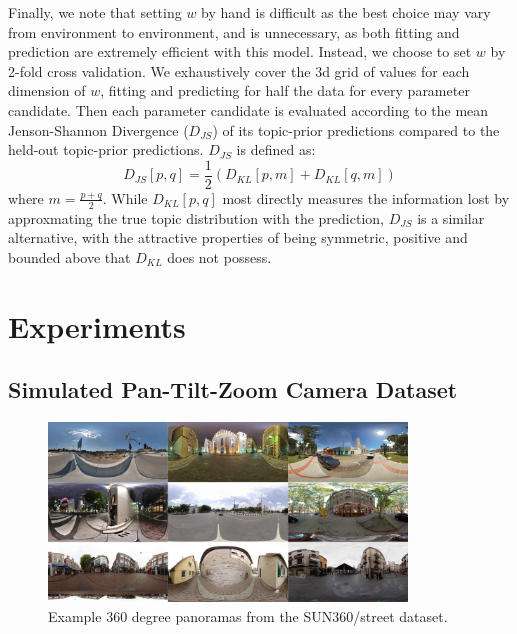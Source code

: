 Finally, we note that setting $w$ by hand is difficult as the best choice may vary from environment to environment, and is unnecessary, as both fitting and prediction are extremely efficient with this model. Instead, we choose to set $w$ by 2-fold cross validation. We exhaustively cover the 3d grid of values for each dimension of $w$, fitting and predicting for half the data for every parameter candidate. Then each parameter candidate is evaluated according to the mean Jenson-Shannon Divergence ($D_{JS}$) of its topic-prior predictions compared to the held-out topic-prior predictions. $D_{JS}$ is defined as:
\begin{equation}
D_{JS}\left[ p, q \right] = \frac{1}{2} \left(D_{KL}[p, m] + D_{KL}[q, m]\right)
\end{equation}
where $m = \frac{p+q}{2}$. While $D_{KL}[p,q]$ most directly measures the information lost by approxmating the true topic distribution with the prediction, $D_{JS}$ is a similar alternative, with the attractive properties of being symmetric, positive and bounded above that $D_{KL}$
 does not possess. 

\section{Experiments}

\subsection{Simulated Pan-Tilt-Zoom Camera Dataset}
\begin{figure}
    \centering
    \includegraphics[width=0.85\textwidth]{figures/ptz/sun360_9x.png}
    \caption{Example 360 degree panoramas from the SUN360/street dataset.}
    \label{fig:sun360_ex}
\end{figure}

